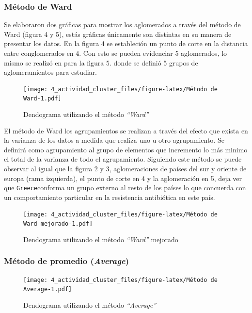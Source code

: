 \documentclass[
]{article}
\begin{document}
\hypertarget{muxe9todo-de-ward}{%
\subsubsection{Método de Ward}\label{muxe9todo-de-ward}}

Se elaboraron dos gráficas para mostrar los aglomerados a través del
método de Ward (figura 4 y 5), estás gráficas únicamente son distintas
en su manera de presentar los datos. En la figura 4 se estableción un
punto de corte en la distancia entre conglomerados en 4. Con esto se
pueden evidenciar 5 aglomerados, lo mismo se realizó en para la figura
5. donde se definió 5 grupos de aglomeramientos para estudiar.

\begin{figure}
\centering
\texttt{[image: 4\_actividad\_cluster\_files/figure-latex/Método de Ward-1.pdf]}
\caption{Dendograma utilizando el método \emph{``Ward''}}
\end{figure}

El método de Ward los agrupamientos se realizan a través del efecto que
exista en la varianza de los datos a medida que realiza uno u otro
agrupamiento. Se definirá como agrupamiento al grupo de elementos que
incremento lo más minimo el total de la varianza de todo el
agrupamiento. Siguiendo este método se puede observar al igual que la
figura 2 y 3, aglomeraciones de países del sur y oriente de europa (rama
izquierda), el punto de corte en 4 y la aglomeración en 5, deja ver que
\texttt{Greece}conforma un grupo externo al resto de los países lo que
concuerda con un comportamiento particular en la resistencia antibiótica
en este país.

\begin{figure}
\centering
\texttt{[image: 4\_actividad\_cluster\_files/figure-latex/Método de Ward mejorado-1.pdf]}
\caption{Dendograma utilizando el método \emph{``Ward''} mejorado}
\end{figure}

\hypertarget{muxe9todo-de-promedio-average}{%
\subsubsection{\texorpdfstring{Método de promedio
(\emph{Average})}{Método de promedio (Average)}}\label{muxe9todo-de-promedio-average}}

\begin{figure}
\centering
\texttt{[image: 4\_actividad\_cluster\_files/figure-latex/Método de Average-1.pdf]}
\caption{Dendograma utilizando el método \emph{``Average''}}
\end{figure}
\end{document}
